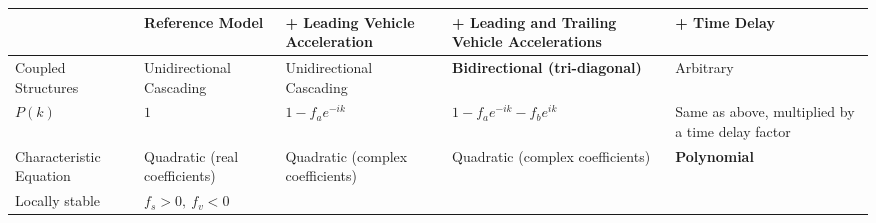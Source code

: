 \documentclass[11pt,a4paper,openany]{book}
\numberwithin{equation}{chapter}
\numberwithin{figure}{chapter}
\numberwithin{table}{chapter}
\begin{document}
\begin{center}
\scriptsize
{}
\label{tab:all-stability-conditions}
\begin{tabular}{p{1.8cm}p{2.9cm}p{3.4cm}p{3.2cm}p{2.5cm}}
\toprule
& \textbf{Reference Model} & \textbf{+ Leading Vehicle Acceleration} & \textbf{+ Leading and Trailing Vehicle Accelerations} & \textbf{+ Time Delay} \\
\midrule







Coupled Structures




&




 Unidirectional Cascading




&




 Unidirectional Cascading




& \textbf{Bidirectional (tri-diagonal)} &




 Arbitrary



\\[3pt]
$P(k)$ & $1$ & $1-f_ae^{-ik}$ & $1-f_ae^{-ik}-f_be^{ik}$ &




 Same as above, multiplied by a time delay factor



\\[3pt]

Characteristic Equation& Quadratic (real coefficients)




&




 Quadratic (complex coefficients)




&




 Quadratic (complex coefficients)




& \textbf{Polynomial} \\[3pt]

Locally stable




& $f_s>0,\ f_v<0$ &





\end{tabular}
\end{center}
\end{document}
